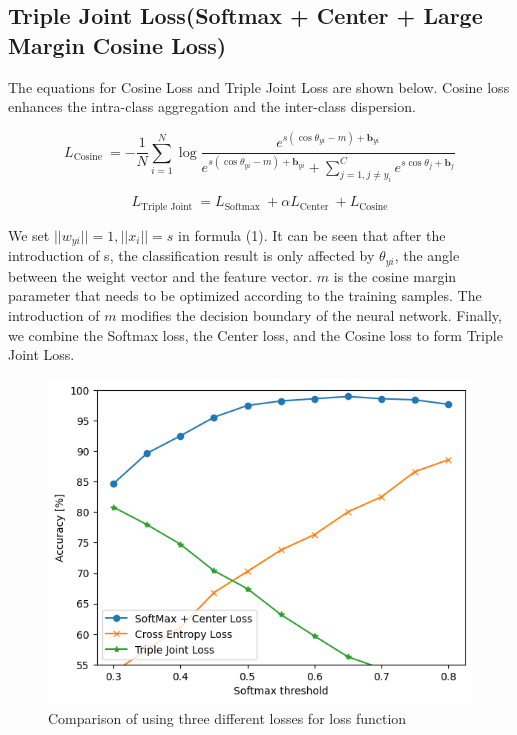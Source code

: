 \documentclass[dvipdfmx]{article}
\begin{document}
\subsection{Triple Joint Loss(Softmax + Center + Large Margin Cosine Loss)}
The equations for Cosine Loss and Triple Joint Loss are shown below. Cosine loss enhances the intra-class aggregation and the inter-class dispersion. 

\begin{equation*}{L_{{\text{Cosine }}}} = - \frac{1}{N}\sum\limits_{i = 1}^N {\log } \frac{{{e^{s\left( {\cos {\theta _{yi}} - m} \right) + {{\mathbf{b}}_{yi}}}}}}{{{e^{s\left( {\cos {\theta _{yi}} - m} \right) + {{\mathbf{b}}_{yi}}}} + \sum\limits_{j = 1,j \ne {y_i}}^C {{e^{s\cos {\theta _j} + {{\mathbf{b}}_j}}}} }}\tag{3}\end{equation*}

\begin{equation*}{L_{{\text{Triple Joint }}}} = {L_{{\text{Softmax }}}} + \alpha {L_{{\text{Center }}}} + {L_{{\text{Cosine}}}}\end{equation*}

We set $||w_{yi}|| = 1, ||x_i|| = s$ in formula (1). It can be seen that after the introduction of s, the classification result is only affected by $\theta_{yi}$, the angle between the weight vector and the feature vector. $m$ is the cosine margin parameter that needs to be optimized
according to the training samples. The introduction of $m$ modifies the decision boundary of the neural network.
Finally, we combine the Softmax loss, the Center loss, and the Cosine loss to form Triple Joint Loss.

\begin{figure}[H]
\begin{center}
\includegraphics[width=0.9\linewidth]{./img/triple_joint.png}
\end{center}
\caption{Comparison of using three different losses for loss function}
\end{figure}
\end{document}
